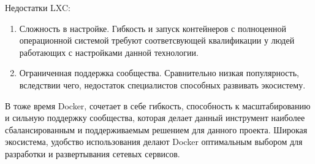 \documentclass[a4paper, 14pt]{extreport}
\begin{document}
\par\noindent Недостатки LXC:
\begin{enumerate}
        \item Сложность в настройке. Гибкость и запуск контейнеров с полноценной операционной системой требуют соответсвующей квалификации
              у людей работающих с настройками данной технологии.
        \item Ограниченная поддержка сообщества. Сравнительно низкая популярность, вследствии чего, недостаток специалистов способных 
              развивать экосистему.
\end{enumerate}
В тоже время Docker, сочетает в себе гибкость, способность к масштабированию и сильную поддержку сообщества, которая делает данный инструмент
наиболее сбалансированным и поддерживаемым решением для данного проекта. Широкая экосистема, удобство использования делают Docker оптимальным
выбором для разработки и развертывания сетевых сервисов.
\end{document}
